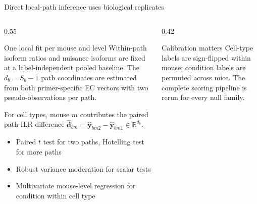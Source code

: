 \documentclass[aspectratio=169,10pt]{beamer}
\begin{document}
\begin{frame}{Direct local-path inference uses biological replicates}
\begin{columns}[T,onlytextwidth]
\begin{column}{0.55\textwidth}
\vspace{0.1cm}
\begin{block}{One local fit per mouse and level}
\scriptsize Within-path isoform ratios and nuisance isoforms are fixed at a label-independent pooled baseline. The $d_b=S_b-1$ path coordinates are estimated from both primer-specific EC vectors with two pseudo-observations per path.
\end{block}
\vspace{0.15cm}
\scriptsize For cell types, mouse $m$ contributes the paired path-ILR difference $\widehat{\bm d}_{bm}=\widehat{\bm y}_{bm2}-\widehat{\bm y}_{bm1}\in\mathbb R^{d_b}$.
\vspace{0.2cm}
\begin{itemize}\scriptsize
\item Paired $t$ test for two paths, Hotelling test for more paths
\item Robust variance moderation for scalar tests
\item Multivariate mouse-level regression for condition within cell type
\end{itemize}
\end{column}
\begin{column}{0.42\textwidth}
\vspace{0.1cm}
\begin{alertblock}{Calibration matters}
\scriptsize Cell-type labels are sign-flipped within mouse; condition labels are permuted across mice. The complete scoring pipeline is rerun for every null family.
\end{alertblock}
\end{column}
\end{columns}
\end{frame}
\end{document}
